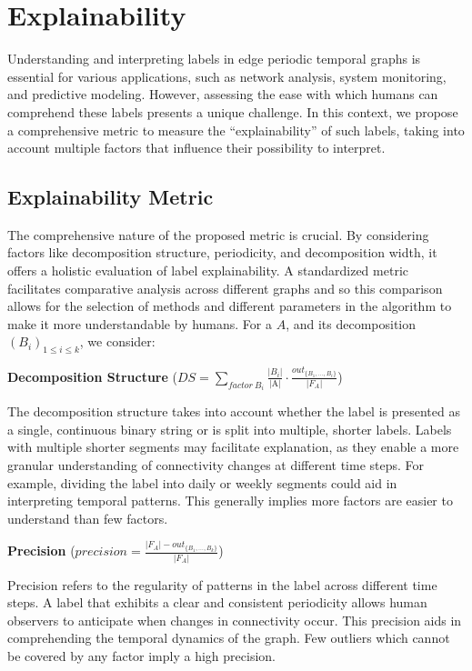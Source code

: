 \chapter{Explainability}

Understanding and interpreting labels in edge periodic temporal graphs is essential for various applications, such as network analysis, system monitoring, and predictive modeling. However, assessing the ease with which humans can comprehend these labels presents a unique challenge. In this context, we propose a comprehensive metric to measure the \enquote{explainability} of such labels, taking into account multiple factors that influence their possibility to interpret.

\section{Explainability Metric}
The comprehensive nature of the proposed metric is crucial. By considering factors like decomposition structure, periodicity, and decomposition width, it offers a holistic evaluation of label explainability. A standardized metric facilitates comparative analysis across different graphs and so this comparison allows for the selection of methods and different parameters in the algorithm to make it more understandable by humans. For a \DFA $A$, and its decomposition $(B_i)_{1 \leq i \leq k}$, we consider:

\textbf{Decomposition Structure} ($DS = \sum\limits_{factor~ B_i}\frac{|B_i|}{\text{|A|}} \cdot \frac{out_{\{B_1,\dots,B_i\}}}{|F_A|}$)

The decomposition structure takes into account whether the label is presented as a single, continuous binary string or is split into multiple, shorter labels. Labels with multiple shorter segments may facilitate explanation, as they enable a more granular understanding of connectivity changes at different time steps. For example, dividing the label into daily or weekly segments could aid in interpreting temporal patterns. This generally implies more factors are easier to understand than few factors.

\textbf{Precision} ($precision = \frac{|F_A| - out_{\{B_1,\dots,B_k\}}}{|F_A|}$)

Precision refers to the regularity of patterns in the label across different time steps. A label that exhibits a clear and consistent periodicity allows human observers to anticipate when changes in connectivity occur. This precision aids in comprehending the temporal dynamics of the graph. Few outliers which cannot be covered by any factor imply a high precision.

